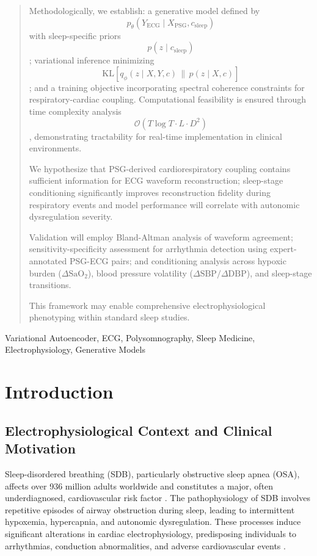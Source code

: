 \documentclass[10pt, conference]{IEEEtran}
\begin{document}
\begin{abstract}
Methodologically, we establish: a generative model defined by 
\[
p_{\theta}(Y_{\mathrm{ECG}} \mid X_{\mathrm{PSG}}, c_{\mathrm{sleep}})
\]
with sleep-specific priors 
\[
p(z \mid c_{\mathrm{sleep}})
\]
; variational inference minimizing 
\[
\mathrm{KL}\left[ q_{\phi}(z \mid X, Y, c) \,\|\, p(z \mid X, c) \right]
\]
; and a training objective incorporating spectral coherence constraints for respiratory-cardiac coupling. Computational feasibility is ensured through time complexity analysis 
\[
\mathcal{O}(T \log T \cdot L \cdot D^{2})
\]
, demonstrating tractability for real-time implementation in clinical environments. 

We hypothesize that PSG-derived cardiorespiratory coupling contains sufficient information for ECG waveform reconstruction; sleep-stage conditioning significantly improves reconstruction fidelity during respiratory events and model performance will correlate with autonomic dysregulation severity.

Validation will employ Bland-Altman analysis of waveform agreement; sensitivity-specificity assessment for arrhythmia detection using expert-annotated PSG-ECG pairs; and conditioning analysis across hypoxic burden (\(\Delta \mathrm{SaO}_2\)), blood pressure volatility (\(\Delta \mathrm{SBP}/\Delta \mathrm{DBP}\)), and sleep-stage transitions. 

This framework may enable comprehensive electrophysiological phenotyping within standard sleep studies.
\end{abstract}

\begin{IEEEkeywords}
Variational Autoencoder, ECG, Polysomnography, Sleep Medicine, Electrophysiology, Generative Models
\end{IEEEkeywords}

\section{Introduction}

\subsection{Electrophysiological Context and Clinical Motivation}

Sleep-disordered breathing (SDB), particularly obstructive sleep apnea (OSA), affects over 936 million adults worldwide and constitutes a major, often underdiagnosed, cardiovascular risk factor \cite{benjafield2019}. The pathophysiology of SDB involves repetitive episodes of airway obstruction during sleep, leading to intermittent hypoxemia, hypercapnia, and autonomic dysregulation. These processes induce significant alterations in cardiac electrophysiology, predisposing individuals to arrhythmias, conduction abnormalities, and adverse cardiovascular events \cite{somers2008}.
\end{document}
